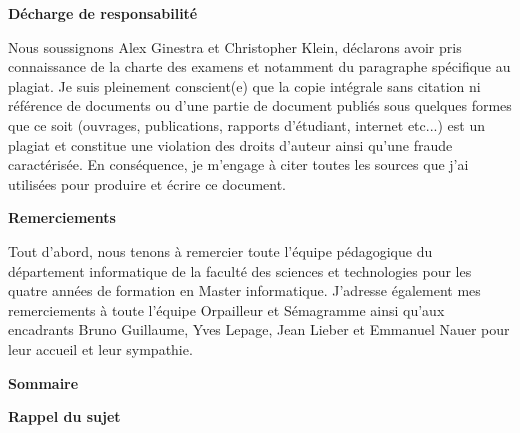 \documentclass{article}
\begin{document}
\thispagestyle{empty}
\begin{center}
{\bfseries \huge D\'echarge de responsabilit\'e}
\end{center}
\vspace*{10mm}

Nous soussignons Alex Ginestra et Christopher Klein, d\'eclarons avoir pris connaissance de la charte des examens et notamment du paragraphe sp\'ecifique au plagiat.\newline
Je suis pleinement conscient(e) que la copie int\'egrale sans citation ni r\'ef\'erence de documents ou d'une partie de document publi\'es sous quelques formes que ce soit (ouvrages, publications, rapports d'\'etudiant, internet etc...) est un plagiat et constitue une violation des droits d'auteur ainsi qu'une fraude caract\'eris\'ee.\newline
En cons\'equence, je m'engage \`{a} citer toutes les sources que j'ai utilis\'ees pour produire et \'ecrire ce document.
\cleardoublepage


\thispagestyle{empty}
\begin{center}
{\bfseries \huge Remerciements}
\end{center}
\vspace*{10mm}

Tout d'abord, nous tenons \`{a} remercier toute l'\'equipe p\'edagogique du d\'epartement informatique de la facult\'e des sciences et technologies pour les quatre ann\'ees de formation en Master informatique.\newline
J'adresse \'egalement mes remerciements \`{a} toute l'\'equipe Orpailleur et S\'emagramme ainsi qu'aux encadrants Bruno Guillaume, Yves Lepage, Jean Lieber et Emmanuel Nauer pour leur accueil et leur sympathie.

\cleardoublepage


\begin{center}
{\bfseries \huge Sommaire}
\end{center}
\tableofcontents


\setcounter{page}{3}

\cleardoublepage

\begin{center}
{\bfseries \huge Rappel du sujet}
\end{center}

\vspace*{10mm}
\end{document}
